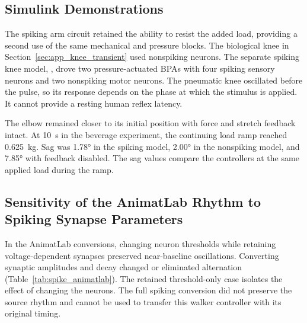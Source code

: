 \subsection{Simulink Demonstrations}

The spiking arm circuit retained the ability to resist the added load, providing a second use of the same mechanical and pressure blocks. The biological knee in Section~\ref{sec:app_knee_transient} used nonspiking neurons. The separate spiking knee model, , drove two pressure-actuated BPAs with four spiking sensory neurons and two nonspiking motor neurons. The pneumatic knee oscillated before the pulse, so its response depends on the phase at which the stimulus is applied. It cannot provide a resting human reflex latency.

The elbow remained closer to its initial position with force and stretch feedback intact. At \qty{10}{\second} in the beverage experiment, the continuing load ramp reached \qty{0.625}{\kilogram}. Sag was \ang{1.78} in the spiking model, \ang{2.00} in the nonspiking model, and \ang{7.85} with feedback disabled. The sag values compare the controllers at the same applied load during the ramp.

\subsection{Sensitivity of the AnimatLab Rhythm to Spiking Synapse Parameters}

In the AnimatLab conversions, changing neuron thresholds while retaining voltage-dependent synapses preserved near-baseline oscillations. Converting synaptic amplitudes and decay changed or eliminated alternation (Table~\ref{tab:spike_animatlab}). The retained threshold-only case isolates the effect of changing the neurons. The full spiking conversion did not preserve the source rhythm and cannot be used to transfer this walker controller with its original timing.

